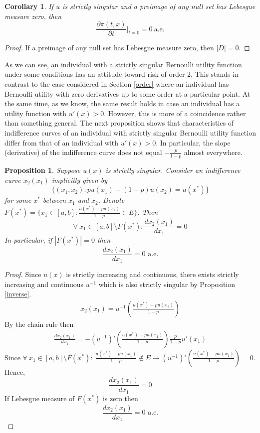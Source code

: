\documentclass[a4paper]{article}
\newtheorem{corollary}{Corollary}[theorem]
\newtheorem{proposition}[theorem]{Proposition}
\begin{document}
\begin{corollary}
	If $u$ is strictly singular and a preimage of any null set has Lebesgue measure zero, then $$\frac{\partial \pi (t, x)}{\partial t} \bigg|_{t=0} = 0\ \text{a.e.}$$
\end{corollary}
\begin{proof}
If a preimage of any null set has Lebesgue measure zero, then $|D| = 0$.
\end{proof}
As we can see, an individual with a strictly singular Bernoulli utility function under some conditions has an attitude toward risk of order 2. This stands in contrast to the case considered in Section \ref{order} where an individual has Bernoulli utility with zero derivatives up to some order at a particular point. At the same time, as we know, the same result holds in case an individual has a utility function with $u'(x) > 0$. However, this is more of a coincidence rather than something general. The next proposition shows that characteristics of indifference curves of an individual with strictly singular Bernoulli utility function differ from that of an individual with $u'(x) > 0$. In particular, the slope (derivative) of the indifference curve does not equal $-\frac{p}{1-p}$ almost everywhere.
\begin{proposition}\label{singular}
	Suppose $u(x)$ is strictly singular. Consider an indifference curve $x_2(x_1)$ implicitly given by $$\{ (x_1, x_2):pu(x_1)+(1-p)u(x_2) = u(x^*) \}$$ for some $x^*$ between $x_1$ and $x_2$. Denote $F(x^*) = \{ x_1 \in [a, b]: \frac{u(x^*) - p u(x_1)}{1-p} \in E\}$. Then $$\forall\ x_1 \in [a, b] \setminus F(x^*):  \frac{dx_2(x_1)}{dx_1} = 0$$ In particular, if $|F(x^*)| = 0$ then $$\frac{dx_2(x_1)}{dx_1} = 0 \text{ a.e.}$$
\end{proposition}
\begin{proof}
	Since $u(x)$ is strictly increasing and continuous, there exists strictly increasing and continuous $u^{-1}$ which is also strictly singular by Proposition \ref{inverse}. \begin{align*}
		x_2(x_1) = u^{-1} \left( \frac{u(x^*) - pu(x_1)}{1-p} \right)
	\end{align*}
By the chain rule then \begin{align*}
	\frac{dx_2(x_1)}{dx_1} = -(u^{-1})'\left( \frac{u(x^*) - pu(x_1)}{1-p} \right)\frac{p}{1-p}u'(x_1)
\end{align*}
Since $\forall\ x_1 \in [a, b] \setminus F(x^*):\ \frac{u(x^*) - pu(x_1)}{1-p} \notin E\to (u^{-1})'\left( \frac{u(x^*) - pu(x_1)}{1-p} \right) = 0$. Hence, $$\frac{dx_2(x_1)}{dx_1} = 0$$
If Lebesgue measure of $F(x^*)$ is zero then $$\frac{dx_2(x_1)}{dx_1} = 0 \text{ a.e.}$$
\end{proof}
\end{document}

